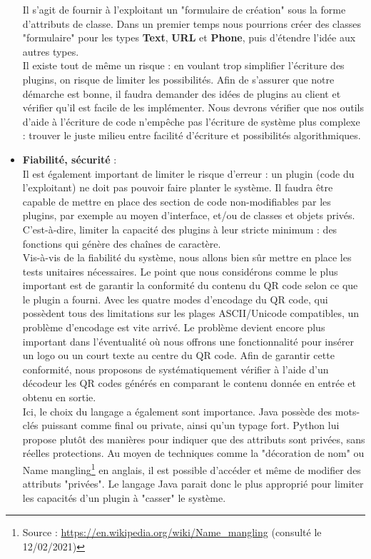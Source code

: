 \documentclass[a4paper,12pt]{article}
\begin{document}
\begin{itemize}
  Il s'agit de fournir à l'exploitant un "formulaire de création" sous la forme d'attributs de classe. Dans un premier temps nous pourrions créer des classes "formulaire" pour les types \textbf{Text}, \textbf{URL} et \textbf{Phone}, puis d'étendre l'idée aux autres types.\\
  
  Il existe tout de même un risque : en voulant trop simplifier l'écriture des plugins, on risque de limiter les possibilités. Afin de s'assurer que notre démarche est bonne, il faudra demander des idées de plugins au client et vérifier qu'il est facile de les implémenter. Nous devrons vérifier que nos outils d'aide à l'écriture de code n'empêche pas l'écriture de système plus complexe : trouver le juste milieu entre facilité d'écriture et possibilités algorithmiques.\\

  \item \textbf{Fiabilité, sécurité} :\\
  Il est également important de limiter le risque d'erreur : un plugin (code du l'exploitant) ne doit pas pouvoir faire planter le système. Il faudra être capable de mettre en place des section de code non-modifiables par les plugins, par exemple au moyen d'interface, et/ou de classes et objets privés. C'est-à-dire, limiter la capacité des plugins à leur stricte minimum : des fonctions qui génère des chaînes de caractère.\\
  
  Vis-à-vis de la fiabilité du système, nous allons bien sûr mettre en place les tests unitaires nécessaires. Le point que nous considérons comme le plus important est de garantir la conformité du contenu du QR code selon ce que le plugin a fourni. Avec les quatre modes d'encodage du QR code, qui possèdent tous des limitations sur les plages ASCII/Unicode compatibles, un problème d'encodage est vite arrivé. Le problème devient encore plus important dans l'éventualité où nous offrons une fonctionnalité pour insérer un logo ou un court texte au centre du QR code. Afin de garantir cette conformité, nous proposons de systématiquement vérifier à l'aide d'un décodeur les QR codes générés en comparant le contenu donnée en entrée et obtenu en sortie.\\
  
  Ici, le choix du langage a également sont importance. Java possède des mots-clés puissant comme final ou private, ainsi qu'un typage fort. Python lui propose plutôt des manières pour indiquer que des attributs sont privées, sans réelles protections. Au moyen de techniques comme la "décoration de nom" ou Name mangling\footnote{Source : \url{https://en.wikipedia.org/wiki/Name_mangling} (consulté le 12/02/2021)} en anglais, il est possible d'accéder et même de modifier des attributs "privées".
  Le langage Java parait donc le plus approprié pour limiter les capacités d'un plugin à "casser" le système.\\
  

\end{itemize}
\end{document}
